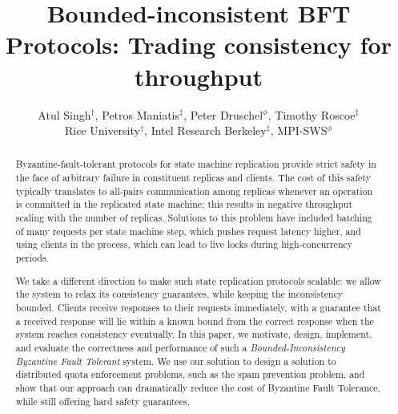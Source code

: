 \documentclass[twocolumn,10pt]{article}
\begin{document}
\newtheorem{theorem}{Theorem}
\newtheorem{lemma}{Lemma}
\newtheorem{definition}{Definition}

\newcommand{\Sys}{BI-BFT\xspace}
\newcommand{\msg}[1]{\ensuremath{\textsc{#1}}}
\newcommand{\note}[1]{[\textcolor{red}{\textit{#1}}]}

\newcommand{\reportsubmission}[2]{#2}



\title{Bounded-inconsistent BFT Protocols: Trading consistency for throughput}
\author{Atul Singh$^{\dag}$,
Petros Maniatis$^{\ddag}$, 
Peter Druschel$^{\phi}$,
Timothy Roscoe$^{\ddag}$
\\
Rice University$^{\dag}$, Intel Research Berkeley$^{\ddag}$, MPI-SWS$^{\phi}$}

\maketitle
\begin{abstract}

Byzantine-fault-tolerant protocols for state machine replication provide
strict safety in the face of arbitrary failure in constituent replicas
and clients.  The cost of this safety typically translates to all-pairs
communication among replicas whenever an operation is committed in the
replicated state machine; this results in negative throughput
scaling with the number of replicas.  Solutions to this problem have
included batching of many requests per state machine step, which pushes
request latency higher, and using clients in the process, which can lead
to live locks during high-concurrency periods.

We take a different direction to make such state
replication protocols scalable: we allow the system to relax its
consistency guarantees, while keeping the inconsistency bounded.
Clients receive responses to their requests immediately, with a
guarantee that a received response will lie within a known bound from
the correct response when the system reaches consistency eventually.  In
this paper, we
motivate, design, implement, and evaluate the correctness and performance of such a
\emph{Bounded-Inconsistency Byzantine Fault Tolerant} system. We use our
solution to design a solution to distributed quota enforcement problems,
such as the spam prevention problem, and show that our approach can
dramatically reduce the cost of Byzantine Fault Tolerance, while still
offering hard safety guarantees.


\end{abstract}
\end{document}
